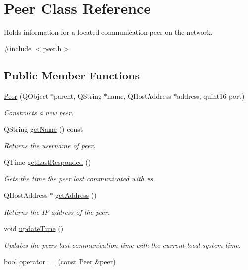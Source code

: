 \hypertarget{class_peer}{
\section{\-Peer \-Class \-Reference}
\label{class_peer}
}


\-Holds information for a located communication peer on the network.  




{\ttfamily \#include $<$peer.\-h$>$}

\subsection*{\-Public \-Member \-Functions}
\begin{DoxyCompactItemize}
\item 
\hyperlink{class_peer_a3360b580084c61a8bc31144ae2af912a}{\-Peer} (\-Q\-Object $\ast$parent, \-Q\-String $\ast$name, \-Q\-Host\-Address $\ast$address, quint16 port)
\begin{DoxyCompactList}\small\item\em \-Constructs a new peer. \end{DoxyCompactList}\item 
\-Q\-String \hyperlink{class_peer_ad66666aca923fe13b4cca3f836d12fa7}{get\-Name} () const 
\begin{DoxyCompactList}\small\item\em \-Returns the username of peer. \end{DoxyCompactList}\item 
\-Q\-Time \hyperlink{class_peer_a1c9797749ddfbb9261e93f51cc3ace9e}{get\-Last\-Responded} ()
\begin{DoxyCompactList}\small\item\em \-Gets the time the peer last communicated with us. \end{DoxyCompactList}\item 
\-Q\-Host\-Address $\ast$ \hyperlink{class_peer_ac1e626629eeaaeebff30f2eda36c3a5e}{get\-Address} ()
\begin{DoxyCompactList}\small\item\em \-Returns the \-I\-P address of the peer. \end{DoxyCompactList}\item 
\hypertarget{class_peer_a49f70d43a1822edaeb8f3f7de66b12e3}{
void \hyperlink{class_peer_a49f70d43a1822edaeb8f3f7de66b12e3}{update\-Time} ()}
\label{class_peer_a49f70d43a1822edaeb8f3f7de66b12e3}

\begin{DoxyCompactList}\small\item\em \-Updates the peers last communication time with the current local system time. \end{DoxyCompactList}\item 
\hypertarget{class_peer_afa304e14507579b7f3aaf8b2e7483f1a}{
bool \hyperlink{class_peer_afa304e14507579b7f3aaf8b2e7483f1a}{operator==} (const \hyperlink{class_peer}{\-Peer} \&peer)}
\label{class_peer_afa304e14507579b7f3aaf8b2e7483f1a}


\end{DoxyCompactItemize}

